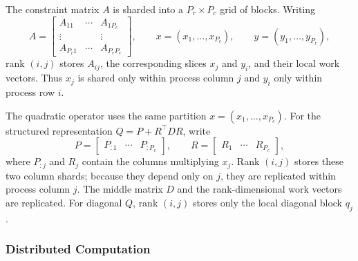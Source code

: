 \documentclass[letterpaper]{article} %
\theoremstyle{definition}
\theoremstyle{remark}
\begin{document}
The constraint matrix $A$ is sharded into a $P_r \times P_c$ grid of blocks.
Writing
\[
    A=
    \begin{bmatrix}
        A_{11}&\cdots&A_{1P_c}\\
        \vdots&&\vdots\\
        A_{P_r1}&\cdots&A_{P_rP_c}
    \end{bmatrix},
    \qquad
    x=(x_1,\ldots,x_{P_c}),
    \qquad
    y=(y_1,\ldots,y_{P_r}),
\]
rank $(i,j)$ stores $A_{ij}$, the corresponding slices $x_j$ and $y_i$, and
their local work vectors. Thus $x_j$ is shared only within process column $j$
and $y_i$ only within process row $i$.

The quadratic operator uses the same partition
$x=(x_1,\ldots,x_{P_c})$. For the structured representation
$Q=P+R^\top D R$, write
\begin{equation}
\label{eq:distributed-q-storage}
    P=\begin{bmatrix}P_{:1}&\cdots&P_{:P_c}\end{bmatrix},
    \qquad
    R=\begin{bmatrix}R_1&\cdots&R_{P_c}\end{bmatrix},
\end{equation}
where $P_{:j}$ and $R_j$ contain the columns multiplying $x_j$. Rank $(i,j)$
stores these two column shards; because they depend only on $j$, they are
replicated within process column $j$. The middle matrix $D$ and the
rank-dimensional work vectors are replicated. For diagonal $Q$, rank $(i,j)$
stores only the local diagonal block $q_j$.

\subsubsection{Distributed Computation}
\end{document}
